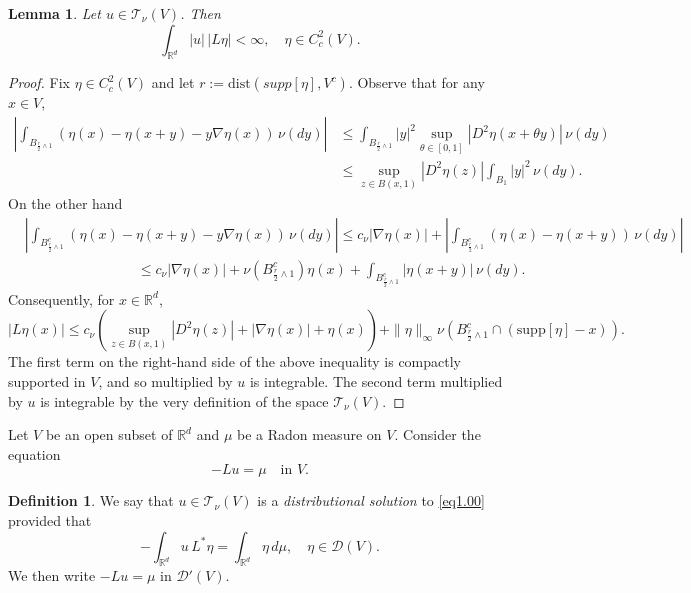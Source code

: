 \documentclass[11pt,a4paper,reqno]{amsart}
\newtheorem{lemma}[theorem]{\bf Lemma}
\theoremstyle{definition}
\newtheorem{definition}[theorem]{Definition}
\numberwithin{equation}{section}
\begin{document}
\begin{lemma}
\label{lm.test1}
Let   $u\in\mathscr T_\nu(V)$.  Then 
\[
\int_{\mathbb R^d}|u|\,|L\eta|<\infty,\quad \eta\in C^2_c(V).
\]
\end{lemma}
\begin{proof}
Fix  $\eta\in C_c^2(V)$ and let    $r:=\text{dist}(supp[\eta],V^c)$. 
Observe that for any $x\in V$,
\[
\begin{split}
\left|\int_{B_{\frac r2\wedge 1}}(\eta(x)-\eta(x+y)-y\nabla\eta(x))\,\nu(dy)\right|&
\le \int_{B_{\frac r2\wedge1}}|y|^2\sup_{\theta\in [0,1]}|D^2\eta(x+\theta y)|\,\nu(dy)
\\&
\le \sup_{z\in B(x,1)}|D^2\eta(z)| \int_{B_{1}}|y|^2\,\nu(dy).
\end{split}
\]
On the other hand  
\[
\begin{split}
&\left|\int_{B^c_{\frac r2\wedge 1}}(\eta(x)-\eta(x+y)-y\nabla\eta(x))\,\nu(dy)\right|
\le c_\nu |\nabla\eta(x)| + \left|\int_{B^c_{\frac r2\wedge1}}(\eta(x)-\eta(x+y))\,\nu(dy)\right|\\&
\qquad\qquad\qquad\qquad\le c_\nu |\nabla\eta(x)|+  \nu(B^c_{\frac r2\wedge1})\eta(x)+\int_{B^c_{\frac r2\wedge1}}|\eta(x+y)|\,\nu(dy).
\end{split}
\]
Consequently, for $x\in\mathbb R^d$,
\[
|L\eta(x)|\le c_\nu\left( \sup_{z\in B(x,1)}|D^2\eta(z)|+|\nabla\eta(x)|+\eta(x)\right)+\|\eta\|_\infty \nu(B^c_{\frac r2\wedge1}\cap (\text{supp}[\eta]-x)).
\]
The first term  on the right-hand side of the above inequality is  compactly supported in $V$, and 
so multiplied by $u$ is integrable. 
The second term multiplied by $u$ is integrable by the very definition of the space  $\mathscr T_\nu(V)$.
\end{proof}



Let $V$ be an open  subset of $\mathbb R^d$ and $\mu$ be a Radon measure on $V$. 
Consider the equation
\begin{equation}
\label{eq1.00}
-Lu=\mu\quad \text{in } V.
\end{equation}



\begin{definition}\label{distributional-solution}
We say that $u\in \mathscr T_\nu (V)$ is a  {\em distributional solution} 
to \eqref{eq1.00} provided that 
\begin{equation}
\label{eq1.3}
-\int_{\mathbb R^d}u \,L^*\eta=\int_{\mathbb R^d}\eta\,d\mu,\quad\eta\in \mathscr D(V).
\end{equation}
We then write $-Lu=\mu$ in $\mathscr D'(V)$.
\end{definition}
\end{document}
